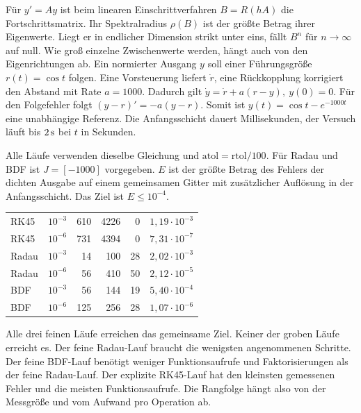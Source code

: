 Für \(y'=Ay\) ist beim linearen Einschrittverfahren \(B=R(hA)\) die Fortschrittsmatrix. Ihr Spektralradius \(\rho(B)\) ist der größte Betrag ihrer Eigenwerte. Liegt er in endlicher Dimension strikt unter eins, fällt \(B^n\) für \(n\to\infty\) auf null. Wie groß einzelne Zwischenwerte werden, hängt auch von den Eigenrichtungen ab.
Ein normierter Ausgang \(y\) soll einer Führungsgröße \(r(t)=\cos t\) folgen. Eine Vorsteuerung liefert \(\dot r\), eine Rückkopplung korrigiert den Abstand mit Rate \(a=1000\). Dadurch gilt \(\dot y=\dot r+a(r-y),\ y(0)=0\). Für den Folgefehler folgt \((y-r)'=-a(y-r)\). Somit ist \(y(t)=\cos t-e^{-1000t}\) eine unabhängige Referenz. Die Anfangsschicht dauert Millisekunden, der Versuch läuft bis \(2\,\mathrm{s}\) bei \(t\) in Sekunden.

Alle Läufe verwenden dieselbe Gleichung und \(\mathrm{atol}=\mathrm{rtol}/100\). Für Radau und BDF ist \(J=[-1000]\) vorgegeben. \(E\) ist der größte Betrag des Fehlers der dichten Ausgabe auf einem gemeinsamen Gitter mit zusätzlicher Auflösung in der Anfangsschicht. Das Ziel ist \(E\le10^{-4}\).
{\tblstart\begin{tabularx}{\linewidth}{@{}Yrrrrr@{}}\toprule
{}&&&&&\\\midrule
RK45 & \(10^{-3}\)&610&4226&0&\(1{,}19\cdot10^{-3}\)\\
RK45 & \(10^{-6}\)&731&4394&0&\(7{,}31\cdot10^{-7}\)\\
Radau & \(10^{-3}\)&14&100&28&\(2{,}02\cdot10^{-3}\)\\
Radau & \(10^{-6}\)&56&410&50&\(2{,}12\cdot10^{-5}\)\\
BDF & \(10^{-3}\)&56&144&19&\(5{,}40\cdot10^{-4}\)\\
BDF & \(10^{-6}\)&125&256&28&\(1{,}07\cdot10^{-6}\)\\\bottomrule
\end{tabularx}\par}
Alle drei feinen Läufe erreichen das gemeinsame Ziel. Keiner der groben Läufe erreicht es. Der feine Radau-Lauf braucht die wenigsten angenommenen Schritte. Der feine BDF-Lauf benötigt weniger Funktionsaufrufe und Faktorisierungen als der feine Radau-Lauf. Der explizite RK45-Lauf hat den kleinsten gemessenen Fehler und die meisten Funktionsaufrufe. Die Rangfolge hängt also von der Messgröße und vom Aufwand pro Operation ab.

